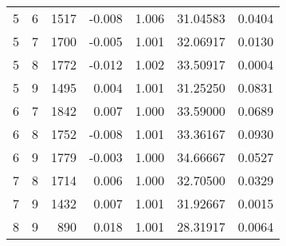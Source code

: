 \begin{longtable}{rrrrrrr}
5 & 6 & 1517 & -0.008 & 1.006 & 31.04583 & 0.0404 \\ 
5 & 7 & 1700 & -0.005 & 1.001 & 32.06917 & 0.0130 \\ 
5 & 8 & 1772 & -0.012 & 1.002 & 33.50917 & 0.0004 \\ 
5 & 9 & 1495 & 0.004 & 1.001 & 31.25250 & 0.0831 \\ 
6 & 7 & 1842 & 0.007 & 1.000 & 33.59000 & 0.0689 \\ 
6 & 8 & 1752 & -0.008 & 1.001 & 33.36167 & 0.0930 \\ 
6 & 9 & 1779 & -0.003 & 1.000 & 34.66667 & 0.0527 \\ 
7 & 8 & 1714 & 0.006 & 1.000 & 32.70500 & 0.0329 \\ 
7 & 9 & 1432 & 0.007 & 1.001 & 31.92667 & 0.0015 \\ 
8 & 9 & 890 & 0.018 & 1.001 & 28.31917 & 0.0064 \\ 
\bottomrule
\end{longtable}

